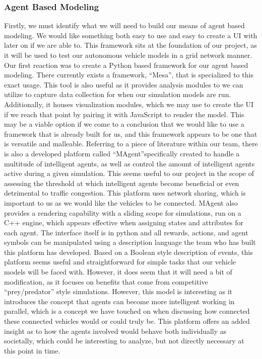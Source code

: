 \documentclass[onecolumn, draftclsnofoot,10pt, compsoc]{IEEEtran}
\begin{document}
\subsubsection{Agent Based Modeling}
Firstly, we must identify what we will need to build our means of agent based modeling.
We would like something both easy to use and easy to create a UI with later on if we are able to.
This framework sits at the foundation of our project, as it will be used to test our autonomous vehicle models in a grid network manner.
Our first reaction was to create a Python based framework for our agent based modeling.
There currently exists a framework, “Mesa”\cite{Mesa}, that is specialized to this exact usage.
This tool is also useful as it provides analysis modules to we can utilize to capture data collection for when our simulation models are run.
Additionally, it houses visualization modules, which we may use to create the UI if we reach that point by pairing it with JavaScript to render the model.
This may be a viable option if we come to a conclusion that we would like to use a framework that is already built for us, and this framework appears to be one that is versatile and malleable.
Referring to a piece of literature within our team, there is also a developed platform called “MAgent”\cite{MAgent}specifically created to handle a multitude of intelligent agents, as well as control the amount of intelligent agents active during a given simulation.
This seems useful to our project in the scope of assessing the threshold at which intelligent agents become beneficial or even detrimental to traffic congestion.
This platform uses network sharing, which is important to us as we would like the vehicles to be connected.
MAgent also provides a rendering capability with a sliding scope for simulations, run on a C++ engine, which appears effective when assigning states and attributes for each agent.
The interface itself is in python and all rewards, actions, and agent symbols can be manipulated using a description language the team who has built this platform has developed.
Based on a Boolean style description of events, this platform seems useful and straightforward for simple tasks that our vehicle models will be faced with.
However, it does seem that it will need a bit of modification, as it focuses on benefits that come from competitive “prey/predator” style simulations.
However, this model is interesting as it introduces the concept that agents can become more intelligent working in parallel, which is a concept we have touched on when discussing how connected these connected vehicles would or could truly be.
This platform offers an added insight as to how the agents involved would behave both individually as societally, which could be interesting to analyze, but not directly necessary at this point in time.
\end{document}
